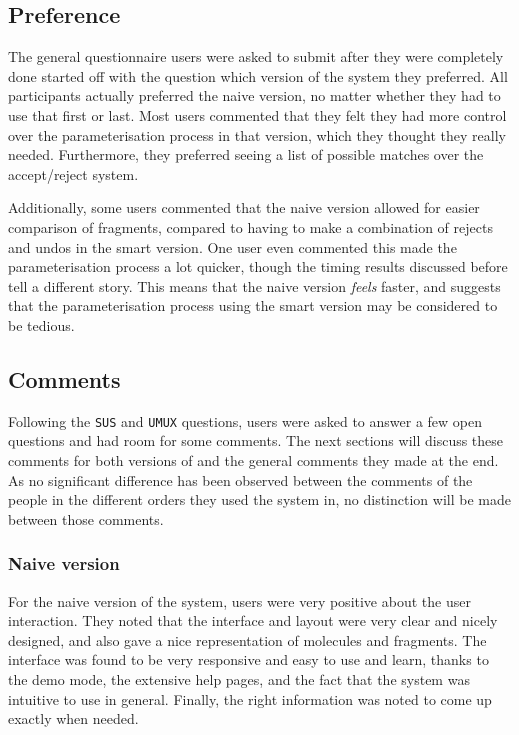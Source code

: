 \subsection{Preference}
The general questionnaire users were asked to submit after they were completely done started off with the question which version of the system they preferred. All participants actually preferred the naive version, no matter whether they had to use that first or last. Most users commented that they felt they had more control over the parameterisation process in that version, which they thought they really needed. Furthermore, they preferred seeing a list of possible matches over the accept/reject system.

Additionally, some users commented that the naive version allowed for easier comparison of fragments, compared to having to make a combination of rejects and undos in the smart version. One user even commented this made the parameterisation process a lot quicker, though the timing results discussed before tell a different story. This means that the naive version \emph{feels} faster, and suggests that the parameterisation process using the smart version may be considered to be tedious.

\subsection{Comments}
Following the \verb|SUS| and \verb|UMUX| questions, users were asked to answer a few open questions and had room for some comments. The next sections will discuss these comments for both versions of \oframp{} and the general comments they made at the end. As no significant difference has been observed between the comments of the people in the different orders they used the system in, no distinction will be made between those comments.

\subsubsection{Naive version}
For the naive version of the system, users were very positive about the user interaction. They noted that the interface and layout were very clear and nicely designed, and also gave a nice representation of molecules and fragments. The interface was found to be very responsive and easy to use and learn, thanks to the demo mode, the extensive help pages, and the fact that the system was intuitive to use in general. Finally, the right information was noted to come up exactly when needed.

